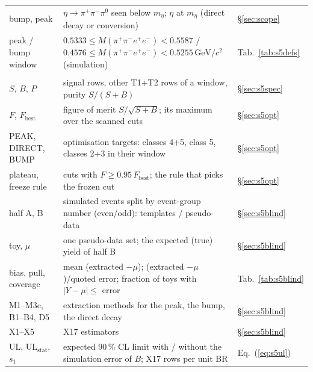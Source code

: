 \documentclass[11pt,a4paper]{article}
\newcommand{\piz}{\ensuremath{\pi^{0}}\xspace}
\newcommand{\pipi}{\ensuremath{\pi^{+}\pi^{-}}\xspace}
\newcommand{\Mfour}{\ensuremath{M(\pi^{+}\pi^{-}e^{+}e^{-})}\xspace}
\newcommand{\GeVcc}{\ensuremath{\mathrm{GeV}/c^{2}}\xspace}
\begin{document}
{\begin{longtable}{@{}>{\raggedright\arraybackslash}p{3.0cm} >{\raggedright\arraybackslash}p{\dimexpr\textwidth-3.0cm-2.2cm-4\tabcolsep\relax} >{\raggedright\arraybackslash}p{2.2cm}@{}}
bump, peak & $\eta\to\pipi\piz$ seen below $m_\eta$; $\eta$ at $m_\eta$ (direct decay or conversion) & \S\ref{sec:scope} \\
peak / bump window & $0.5333\le\Mfour<0.5587$ / $0.4576\le\Mfour<0.5255$\,\GeVcc (simulation) & Tab.~\ref{tab:s5defs} \\
\midrule
\multicolumn{3}{@{}l}{\textbf{Optimisation and blind test (Section~\ref{sec:simres})}} \\
$S$, $B$, $P$ & signal rows, other T1+T2 rows of a window, purity $S/(S+B)$ & \S\ref{sec:s5spec} \\
$F$, $F_{\mathrm{best}}$ & figure of merit $S/\sqrt{S+B}$; its maximum over the scanned cuts & \S\ref{sec:s5opt} \\
PEAK, DIRECT, BUMP & optimisation targets: classes 4+5, class 5, classes 2+3 in their window & \S\ref{sec:s5opt} \\
plateau, freeze rule & cuts with $F\ge0.95\,F_{\mathrm{best}}$; the rule that picks the frozen cut & \S\ref{sec:s5opt} \\
half A, B & simulated events split by event-group number (even/odd): templates / pseudo-data & \S\ref{sec:s5blind} \\
toy, $\mu$ & one pseudo-data set; the expected (true) yield of half B & \S\ref{sec:s5blind} \\
bias, pull, coverage & mean (extracted $-\mu$); (extracted $-\mu$)/quoted error; fraction of toys with $|Y-\mu|\le$ error & Tab.~\ref{tab:s5blind} \\
M1--M3c, B1--B4, D5 & extraction methods for the peak, the bump, the direct decay & \S\ref{sec:s5blind} \\
X1--X5 & X17 estimators & \S\ref{sec:s5blind} \\
UL, $\mathrm{UL}_{\mathrm{stat}}$, $s_1$ & expected 90\,\% CL limit with / without the simulation error of $B$; X17 rows per unit BR & Eq.~(\ref{eq:s5ul}) \\
\end{longtable}
}

\end{document}
